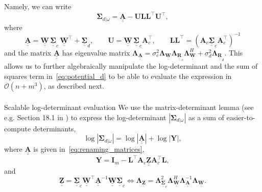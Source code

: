 \documentclass[12pt]{article}
\makeatletter
\let\oldparagraph\paragraph
\renewcommand{\paragraph}{
    \@ifstar
      \xxxParagraphStar
      \xxxParagraphNoStar
  }
\newcommand{\xxxParagraphStar}[1]{\oldparagraph*{#1}\mbox{}}
\newcommand{\xxxParagraphNoStar}[1]{\oldparagraph{#1}\mbox{}}
\newcommand{\mybcirc}[1] {\underline{\underline{\bm{#1}}}}
\makeatother
\begin{document}
Namely, we can write
\begin{equation} \label{eq:Sigma_dw}
    \bm{\Sigma}_{d|\omega} = \mybcirc{A} - \bm{U}\bm{L} \bm{L}^{\top} \bm{U}^{\top},
\end{equation}
where 
\begin{equation} \label{eq:renaming_matrices}
    \mybcirc{A}=\mybcirc{W} \, \mybcirc{\Sigma}_{c} \, \mybcirc{W}^{\top}  + \mybcirc{\Sigma}_d, 
    \qquad \bm{U}=\mybcirc{W} \, \mybcirc{\Sigma}_{c} \bm{A}_c^{\top},
    \qquad
    \bm{L}\bm{L}^{\top}=(\bm{A}_c \mybcirc{\Sigma}_{c} \bm{A}_c^{\top})^{-1}
\end{equation}
and the matrix $\mybcirc{A}$ has eigenvalue matrix $\bm{\Lambda}_{\mybcirc{A}} = \sigma_c^2 \bm{\Lambda}_{\mybcirc{W}}\bm{\Lambda}_{\mybcirc{R}_{c}}\bm{\Lambda}_{\mybcirc{W}}^{H} + \sigma_d^2 \bm{\Lambda}_{\mybcirc{R}_{d}}$.
This allows us to further algebraically manipulate the log-determinant and the sum of squares term in~\eqref{eq:potential_d} to be able to evaluate the expression in $\mathcal{O}(n+m^3)$, as described next.

\paragraph{Scalable log-determinant evaluation} \label{sec:determinant}
We use the matrix-determinant lemma (see e.g. Section 18.1 in \citet{Harville1997}) to express the log-determinant $|\bm{\Sigma}_{d|\omega}|$ as a sum of easier-to-compute determinants,
\begin{equation} \label{eq:det_sigma_dw_efficient}
    \log |\bm{\Sigma}_{d|\omega}|
    = \log |\mybcirc{A}| + \log |\bm{Y}|,
\end{equation}
where $\mybcirc{A}$ is given in~\eqref{eq:renaming_matrices},
\begin{equation} \label{eq:Y}
    \bm{Y} = \bm{I}_m -\bm{L}^{\top} \bm{A}_c  \mybcirc{Z} \bm{A}_c^{\top} \bm{L},
\end{equation}
and 
\begin{equation} \label{eq:Z}
    \mybcirc{Z}=\mybcirc{\Sigma}_c \mybcirc{W}^{\top} \mybcirc{A}^{-1}\mybcirc{W} \mybcirc{\Sigma}_c 
    \iff 
    \bm{\Lambda}_{\mybcirc{Z}}
    =
    \bm{\Lambda}_{\mybcirc{\Sigma}_{c}}^2
    \bm{\Lambda}_{\mybcirc{W}}^{H}
    \bm{\Lambda}_{\mybcirc{A}}^{-1}
    \bm{\Lambda}_{\mybcirc{W}}.
\end{equation}
\end{document}

